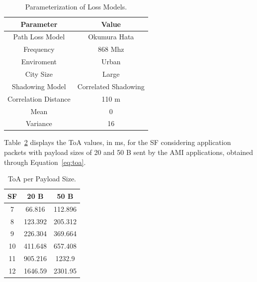 \documentclass[a4paper,fleqn]{cas-dc}
\begin{document}
\begin{table}[ht]
    \centering
    \caption{Parameterization of Loss Models.}
    \begin{tabular}{cc}
        \hline \hline
        Parameter & Value \\ \hline
        Path Loss Model & Okumura Hata\\
        Frequency & 868 Mhz\\
        Enviroment & Urban\\
        City Size & Large\\ \hline
        Shadowing Model & Correlated Shadowing \\ 
        Correlation Distance & 110 m \\
        Mean & 0 \\
        Variance & 16 \\ \hline \hline
    \end{tabular}
    \label{tab:losses}
\end{table}

Table~\ref{tab:toas} displays the \gls{ToA} values, in ms, for the \gls{SF} considering application packets with payload sizes of 20 and 50 B sent by the \gls{AMI} applications, obtained through Equation~\ref{eq:toa}.

\begin{table}[ht]
    \centering
    \caption{\gls{ToA} per Payload Size.}
    \begin{tabular}{ccc}
        \hline \hline
         SF & 20 B & 50 B\\ \hline
          7 & 66.816 & 112.896 \\
          8 & 123.392 & 205.312 \\
          9 & 226.304 & 369.664 \\
         10 & 411.648 & 657.408 \\  
         11 & 905.216 & 1232.9 \\
         12 & 1646.59 & 2301.95 \\ \hline \hline
    \end{tabular}
    \label{tab:toas}
\end{table}
\end{document}
